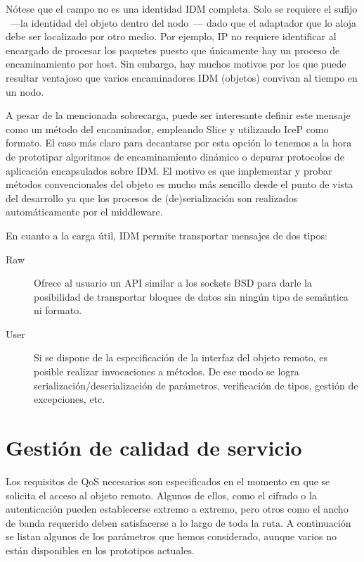 \documentclass{arco-article}
\newcommand{\id}[1]{\texttt{\textbf{\textscale{.90}{#1}}}}
\def \mw {middleware}
\begin{document}
Nótese que el campo \id{router} no es una identidad \ac{IDM}
completa. Solo se requiere el sufijo ~---la identidad del objeto
dentro del nodo~--- dado que el adaptador que lo aloja debe ser
localizado por otro medio. Por ejemplo, \ac{IP} no requiere
identificar al encargado de procesar los paquetes puesto que
únicamente hay un proceso de encaminamiento por host. Sin embargo, hay
muchos motivos por los que puede resultar ventajoso que varios
encaminadores \ac{IDM} (objetos) convivan al tiempo en un nodo.

A pesar de la mencionada sobrecarga, puede ser interesante definir
este mensaje como un método del encaminador, empleando Slice y
utilizando \ac{IceP} como formato. El caso más claro para decantarse
por esta opción lo tenemos a la hora de prototipar algoritmos de
encaminamiento dinámico o depurar protocolos de aplicación
encapsulados sobre \ac{IDM}. El motivo es que implementar y probar
métodos convencionales del objeto es mucho más sencillo desde el punto
de vista del desarrollo ya que los procesos de (de)serialización son
realizados automáticamente por el \mw.

En cuanto a la carga útil, \ac{IDM} permite transportar mensajes de
dos tipos:

\begin{description}
\item[Raw] Ofrece al usuario un \ac{API} similar a los sockets
  \ac{BSD} para darle la posibilidad de transportar bloques de datos
  sin ningún tipo de semántica ni formato.

\item[User] Si se dispone de la especificación de la interfaz del
  objeto remoto, es posible realizar invocaciones a métodos. De ese
  modo se logra serialización/deserialización de parámetros,
  verificación de tipos, gestión de excepciones, etc.
\end{description}


\section{Gestión de calidad de servicio}

Los requisitos de \ac{QoS} necesarios son especificados en el momento
en que se solicita el acceso al objeto remoto.  Algunos de ellos, como
el cifrado o la autenticación pueden establecerse extremo a extremo,
pero otros como el ancho de banda requerido deben satisfacerse a lo
largo de toda la ruta.  A continuación se listan algunos de los
parámetros que hemos considerado, aunque varios no están disponibles
en los prototipos actuales.
\end{document}
